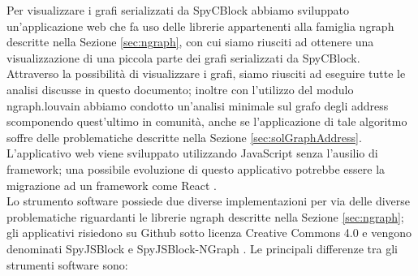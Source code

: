 Per visualizzare i grafi serializzati da SpyCBlock abbiamo sviluppato un'applicazione web che fa uso delle librerie appartenenti alla famiglia ngraph descritte nella Sezione \ref{sec:ngraph}, con cui siamo riusciti ad ottenere una visualizzazione di una piccola parte dei grafi serializzati da SpyCBlock.\\
Attraverso la possibilità di visualizzare i grafi, siamo riusciti ad eseguire tutte le analisi discusse in questo documento; inoltre con l'utilizzo del modulo ngraph.louvain abbiamo condotto un'analisi minimale sul grafo degli address scomponendo quest'ultimo in comunità, anche se l'applicazione di tale algoritmo soffre delle problematiche descritte nella Sezione \ref{sec:solGraphAddress}.\\
L'applicativo web viene sviluppato utilizzando JavaScript senza l'ausilio di framework; una possibile evoluzione di questo applicativo potrebbe essere la migrazione ad un framework come React \cite{vis:react}.\\
Lo strumento software possiede due diverse implementazioni per via delle diverse problematiche riguardanti le librerie ngraph descritte nella Sezione \ref{sec:ngraph}; gli applicativi risiedono su Github sotto licenza Creative Commons 4.0 e vengono denominati SpyJSBlock \cite{vis:SpyJSBlock} e SpyJSBlock-NGraph \cite{vis:SpyJSBlock-Ngraph}.
Le principali differenze tra gli strumenti software sono:
